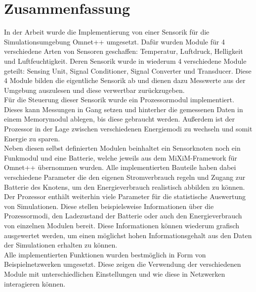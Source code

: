 \chapter{Zusammenfassung}

In der Arbeit wurde die Implementierung von einer Sensorik für die Simulationsumgebung Omnet++ umgesetzt. Dafür wurden Module für 4 verschiedene Arten von Sensoren geschaffen: Temperatur, Luftdruck, Helligkeit und Luftfeuchtigkeit. Deren Sensorik wurde in wiederum 4 verschiedene Module geteilt: Sensing Unit, Signal Conditioner, Signal Converter und Transducer. Diese 4 Module bilden die eigentliche Sensorik ab und dienen dazu Messwerte aus der Umgebung auszulesen und diese verwertbar zurückzugeben.\\
Für die Steuerung dieser Sensorik wurde ein Prozessormodul implementiert. Dieses kann Messungen in Gang setzen und hinterher die gemessenen Daten in einem Memorymodul ablegen, bis diese gebraucht werden. Außerdem ist der Prozessor in der Lage zwischen verschiedenen Energiemodi zu wechseln und somit Energie zu sparen.\\
Neben diesen selbst definierten Modulen beinhaltet ein Sensorknoten noch ein Funkmodul und eine Batterie, welche jeweils aus dem MiXiM-Framework für Omnet++ übernommen wurden. Alle implementierten Bauteile haben dabei verschiedene Parameter die den eigenen Stromverbrauch regeln und Zugang zur Batterie des Knotens, um den Energieverbrauch realistisch abbilden zu können.\\
Der Prozessor enthält weiterhin viele Parameter für die statistische Auswertung von Simulationen. Diese stellen beispielsweise Informationen über die Prozessormodi, den Ladezustand der Batterie oder auch den Energieverbrauch von einzelnen Modulen bereit. Diese Informationen können wiederum grafisch ausgewertet werden, um einen möglichst hohen Informationsgehalt aus den Daten der Simulationen erhalten zu können.\\
Alle implementierten Funktionen wurden bestmöglich in Form von Beispielnetzwerken umgesetzt. Diese zeigen die Verwendung der verschiedenen Module mit unterschiedlichen Einstellungen und wie diese in Netzwerken interagieren können.